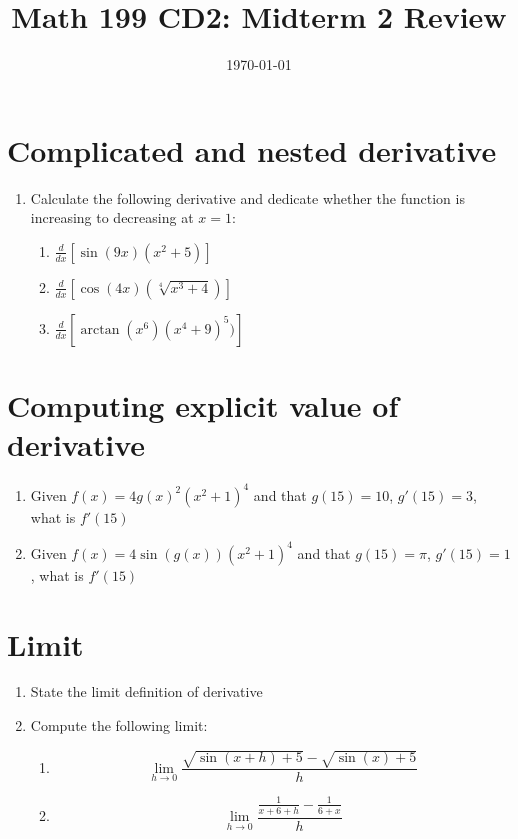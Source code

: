 \documentclass[12pt]{article}
\title{Math 199 CD2: Midterm 2 Review}
\date{\today}
\begin{document}
	
	\maketitle
	\section{Complicated and nested derivative}
	\begin{enumerate}
		\item Calculate the following derivative and dedicate whether the function is increasing to decreasing at $x=1$:
		\begin{enumerate}
			\item $\frac{d}{dx}\left[\sin(9x)(x^2+5)\right]$
			\vfill
			\item $\frac{d}{dx}\left[\cos(4x)(\sqrt[4]{x^3+4})\right]$
			\vfill
			\item $\frac{d}{dx}\left[\arctan(x^6)(x^4+9)^5)\right]$
			\vfill
		\end{enumerate}
	\end{enumerate}
\newpage
	\section{Computing explicit value of derivative}
	\begin{enumerate}
		\item Given $f(x)=4g(x)^2(x^2+1)^4$ and that $g(15)=10$, $g'(15)=3$, what is $f'(15)$
		\vskip 4cm
		\item Given $f(x)=4\sin(g(x))(x^2+1)^4$ and that $g(15)=\pi$, $g'(15)=1$, what is $f'(15)$
		\vskip 4cm
	\end{enumerate}
	\section{Limit}
	
	\begin{enumerate}
		\item State the limit definition of derivative
		\vskip 2cm
		\item Compute the following limit:
		\begin{enumerate}
			\item $$ \lim_{h \to 0}\frac{\sqrt{\sin(x+h)+5}-\sqrt{\sin(x)+5}}{h}$$
			
			\vskip 2cm
			\item $$\lim_{h \to 0}\frac{\frac{1}{x+6+h}-\frac{1}{6+x}}{h}$$
		\end{enumerate}
	\end{enumerate}
	
\end{document}
